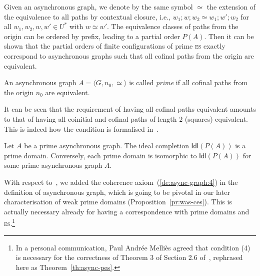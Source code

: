 \documentclass[conference]{IEEEtran}
\newcommand{\ideal}[1]{\ensuremath{\mathsf{Idl}({#1})}}
\newcommand{\esabbr}{\textsc{es}}
\begin{document}
Given an asynchronous graph, we denote by the same symbol $\simeq$ the
extension of the equivalence to all paths by contextual closure, i.e.,
$w_1;w;w_2 \simeq w_1;w';w_2$ for all $w_1, w_2, w, w' \in U^*$ with $w \simeq w'$.
%
The equivalence
classes of paths from the origin can be ordered by prefix, leading to
a partial order $P(A)$.
%
Then it can be shown that the partial orders of finite configurations
of prime {\esabbr} exactly correspond to asynchronous graphs such
that all cofinal paths from the origin are %
equivalent.

\begin{definition}
  An asynchronous graph 
  $A = \langle G, n_0, \simeq \rangle$ is called  \emph{prime} if 
  all cofinal paths from the origin $n_0$ are equivalent.
\end{definition}

It can be seen that the requirement of having all cofinal paths equivalent amounts to that of having all {coinitial and cofinal} paths of length $2$ (squares) equivalent. This is indeed how the condition is formalised in~\cite{PU:RMC}.

\begin{theorem}[asynchronous graphs/prime {\esabbr}~\cite{Mel:hab}]
  \label{th:async-pes}
  Let $A$ be a prime asynchronous graph. The ideal completion
  $\ideal{P(A)}$ is a prime domain. Conversely, each
  prime domain is isomorphic to $\ideal{P(A)}$ for some prime
  asynchronous graph $A$.
\end{theorem}

With respect to~\cite{Mel:hab},
we added the coherence
axiom~(\ref{de:async-graph:4}) in the definition of
asynchronous graph, which
is going to be pivotal in our later characterisation of weak prime domains (Proposition~\ref{pr:was-ces}). This is actually necessary already for having a correspondence with
prime domains and {\esabbr}.\footnote{In a personal communication, Paul Andr\'ee Melli\`es agreed that condition (4) is necessary for the correctness of Theorem 3 of Section 2.6 of~\cite{Mel:hab},
rephrased here as Theorem~\ref{th:async-pes}.
}
\end{document}
